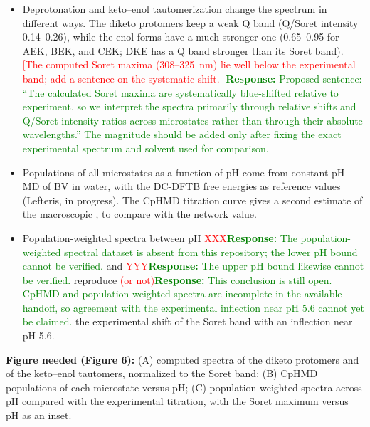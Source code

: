 \begin{itemize}
\item Deprotonation and keto--enol tautomerization change the spectrum in different ways. The diketo protomers keep a weak Q band (Q/Soret intensity 0.14--0.26), while the enol forms have a much stronger one (0.65--0.95 for AEK, BEK, and CEK; DKE has a Q band stronger than its Soret band). \textcolor{red}{[The computed Soret maxima (308--325~nm) lie well below the experimental band; add a sentence on the systematic shift.]}
\textcolor{green}{\textbf{Response:} Proposed sentence: ``The calculated Soret maxima are systematically blue-shifted relative to experiment, so we interpret the spectra primarily through relative shifts and Q/Soret intensity ratios across microstates rather than through their absolute wavelengths.'' The magnitude should be added only after fixing the exact experimental spectrum and solvent used for comparison.}
\item Populations of all microstates as a function of pH come from constant-pH MD of BV in water, with the DC-DFTB free energies as reference values (Lefteris, in progress). The CpHMD titration curve gives a second estimate of the macroscopic \pka{}, to compare with the network value.
\item Population-weighted spectra between pH \textcolor{red}{XXX}\textcolor{green}{\textbf{Response:} The population-weighted spectral dataset is absent from this repository; the lower pH bound cannot be verified.} and \textcolor{red}{YYY}\textcolor{green}{\textbf{Response:} The upper pH bound likewise cannot be verified.} reproduce \textcolor{red}{(or not)}\textcolor{green}{\textbf{Response:} This conclusion is still open. CpHMD and population-weighted spectra are incomplete in the available handoff, so agreement with the experimental inflection near pH 5.6 cannot yet be claimed.} the experimental shift of the Soret band with an inflection near pH 5.6.\cite{shangBiliverdinAmidesReveal2010}
\end{itemize}

\noindent\textbf{Figure needed (Figure 6):} (A) computed spectra of the diketo protomers and of the keto--enol tautomers, normalized to the Soret band; (B) CpHMD populations of each microstate versus pH; (C) population-weighted spectra across pH compared with the experimental titration, with the Soret maximum versus pH as an inset.
